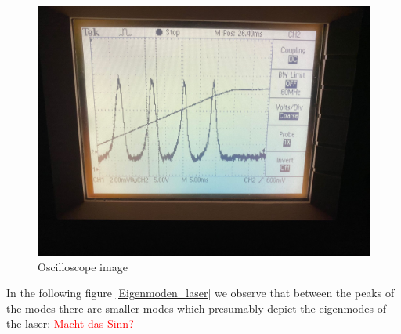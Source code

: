 \documentclass{article}
\begin{document}
\begin{figure}[h!]
\includegraphics[width=\textwidth]{oszilloskopbild.jpg}
\caption{Oscilloscope image}
\label{Osz1}
\end{figure}

In the following figure \ref{Eigenmoden_laser} we observe that between the peaks of the modes there are smaller modes which presumably depict the eigenmodes of the laser:
\textcolor{red}{Macht das Sinn?} \\
\end{document}
